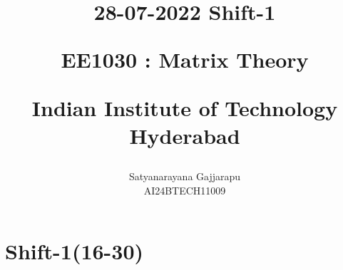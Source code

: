 \documentclass[journal]{IEEEtran}
\begin{document}

\vspace{3cm}




\title{
28-07-2022 Shift-1

\large{EE1030 : Matrix Theory}

Indian Institute of Technology Hyderabad
}
\author{Satyanarayana Gajjarapu

AI24BTECH11009
}	





\maketitle




\bigskip

\renewcommand{\thefigure}{\theenumi}
\renewcommand{\thetable}{\theenumi}


\section{\large Shift-1(16-30)}
\end{document}
